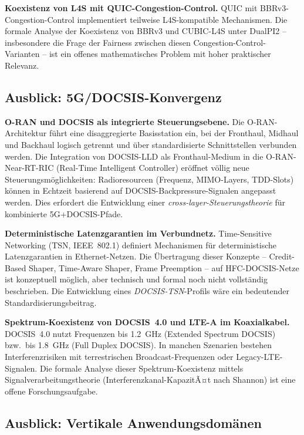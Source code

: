 ﻿\documentclass[a4paper,12pt]{article}
\theoremstyle{definition}
\begin{document}
\textbf{Koexistenz von L4S mit QUIC-Congestion-Control.}
QUIC \cite{iyengar2021rfc9000} mit BBRv3-Congestion-Control implementiert
teilweise L4S-kompatible Mechanismen. Die formale Analyse der Koexistenz
von BBRv3 und CUBIC-L4S unter DualPI2 -- insbesondere die Frage der
Fairness zwischen diesen Congestion-Control-Varianten -- ist ein offenes
mathematisches Problem mit hoher praktischer Relevanz.

\subsection{Ausblick: 5G/DOCSIS-Konvergenz}

\textbf{O-RAN und DOCSIS als integrierte Steuerungsebene.}
Die O-RAN-Architektur \cite{oran2022} f\"{u}hrt eine disaggregierte Basisstation
ein, bei der Fronthaul, Midhaul und Backhaul logisch getrennt und \"{u}ber
standardisierte Schnittstellen verbunden werden. Die Integration von
DOCSIS-LLD als Fronthaul-Medium in die O-RAN-Near-RT-RIC (Real-Time Intelligent
Controller) er\"{o}ffnet v\"{o}llig neue Steuerungsm\"{o}glichkeiten: Radioresourcen
(Frequenz, MIMO-Layers, TDD-Slots) k\"{o}nnen in Echtzeit basierend auf
DOCSIS-Backpressure-Signalen angepasst werden. Dies erfordert die Entwicklung
einer \emph{cross-layer-Steuerungstheorie} f\"{u}r kombinierte 5G+DOCSIS-Pfade.

\textbf{Deterministische Latenzgarantien im Verbundnetz.}
Time-Sensitive Networking (TSN, IEEE~802.1) definiert Mechanismen f\"{u}r
deterministische Latenzgarantien in Ethernet-Netzen. Die \"{U}bertragung dieser
Konzepte -- Credit-Based Shaper, Time-Aware Shaper, Frame Preemption --
auf HFC-DOCSIS-Netze ist konzeptuell m\"{o}glich, aber technisch und formal
noch nicht vollst\"{a}ndig beschrieben. Die Entwicklung eines \emph{DOCSIS-TSN}-Profils
w\"{a}re ein bedeutender Standardisierungsbeitrag.

\textbf{Spektrum-Koexistenz von DOCSIS~4.0 und LTE-A im Koaxialkabel.}
DOCSIS~4.0 nutzt Frequenzen bis 1.2~GHz (Extended Spectrum DOCSIS) bzw.\ bis
1.8~GHz (Full Duplex DOCSIS). In manchen Szenarien bestehen Interferenzrisiken
mit terrestrischen Broadcast-Frequenzen oder Legacy-LTE-Signalen. Die formale
Analyse dieser Spektrum-Koexistenz mittels Signalverarbeitungstheorie
(Interferenzkanal-KapazitÃ¤t nach Shannon) ist eine offene Forschungsaufgabe.

\subsection{Ausblick: Vertikale Anwendungsdom\"{a}nen}
\end{document}
